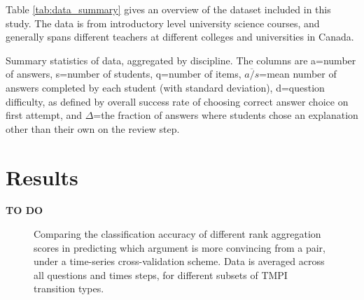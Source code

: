 \documentclass[sigconf]{acmart}
\begin{document}
Table \ref{tab:data_summary} gives an overview of the dataset included in this 
study.
The data is from introductory level university science courses, and generally 
spans different teachers at different colleges and universities in Canada. 
 
\begin{table}
	
	\caption{
		Summary statistics of data, aggregated by discipline. 
		The columns are a=number of answers, s=number of students, q=number of 
		items, $\overline{a/s}$=mean number of answers completed by each 
		student (with standard deviation), d=question difficulty, as defined by 
		overall success rate of choosing correct answer choice on first 
		attempt, and $\Delta$=the fraction of answers where students chose an 
		explanation other than their own on the review step. 
	}
	\label{tab:data_summary}
\end{table}

\section{Results}
\textbf{TO DO}



\begin{figure}
	\scalebox{0.6}{}
	\caption{
		Comparing the classification accuracy of different rank aggregation 
		scores in predicting which argument is more convincing from a pair, 
		under a time-series cross-validation scheme. Data is averaged across 
		all questions and times steps, for different subsets of 
		TMPI transition types. 
	}
	\label{fig:acc_by_rank_score_type}
\end{figure}


%	
\end{document}
